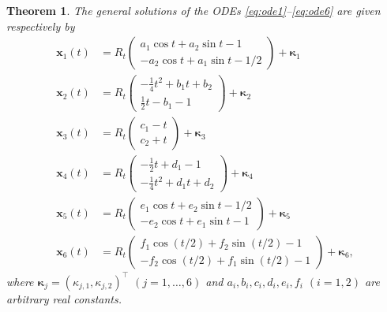\documentclass[11pt]{article}
\newtheorem{thm}{Theorem}
\newcommand{\rotmat}[1]{R_{#1}}
\begin{document}
\begin{thm}
The general solutions of the ODEs \eqref{eq:ode1}--\eqref{eq:ode6} are given respectively by
\begin{align}\mathbf{x}_1(t) &= 
\rotmat{t}
\begin{pmatrix}
a_1 \cos t + a_2 \sin t - 1 \\
-a_2 \cos t + a_1 \sin t - 1/2
\end{pmatrix} + \boldsymbol{\kappa}_1
\label{eq:ode1-gensolution}
\tag{SOL1}
\\[5pt]
\mathbf{x}_2(t) &= 
\rotmat{t}
\begin{pmatrix} 
-\tfrac14 t^2 + b_1 t + b_2 \\[3pt] \tfrac12 t - b_1 - 1
\end{pmatrix}
+\boldsymbol{\kappa}_2
\label{eq:ode2-gensolution}
\tag{SOL2}
\\[5pt]
\mathbf{x}_3(t) &= 
\rotmat{t}
\begin{pmatrix} 
c_1-t \\ c_2+t
\end{pmatrix}
+\boldsymbol{\kappa}_3
\label{eq:ode3-gensolution}
\tag{SOL3}
\\[5pt]
\mathbf{x}_4(t) &= 
\rotmat{t}
\begin{pmatrix} 
-\tfrac12 t + d_1 - 1 \\[3pt]
 -\tfrac14 t^2 + d_1 t + d_2
\end{pmatrix}
+\boldsymbol{\kappa}_4
\label{eq:ode4-gensolution}
\tag{SOL4}
\\[5pt]
\mathbf{x}_5(t) &= 
\rotmat{t}
\begin{pmatrix}
e_1 \cos t + e_2 \sin t - 1/2 \\
-e_2 \cos t + e_1 \sin t - 1
\end{pmatrix} + \boldsymbol{\kappa}_5
\label{eq:ode5-gensolution}
\tag{SOL5}
\\[5pt]
\mathbf{x}_6(t) &= 
\rotmat{t}
\begin{pmatrix}
f_1 \cos (t/2) + f_2 \sin (t/2) - 1 \\
-f_2 \cos (t/2) + f_1 \sin (t/2) - 1
\end{pmatrix} + \boldsymbol{\kappa}_6,
\label{eq:ode6-gensolution}
\tag{SOL6}
\end{align}
where $\boldsymbol{\kappa}_j=(\kappa_{j,1},\kappa_{j,2})^\top$ $(j=1,\ldots,6)$ and $a_i, b_i, c_i, d_i, e_i, f_i$ $(i=1,2)$ are arbitrary real constants.
\end{thm}
\end{document}
